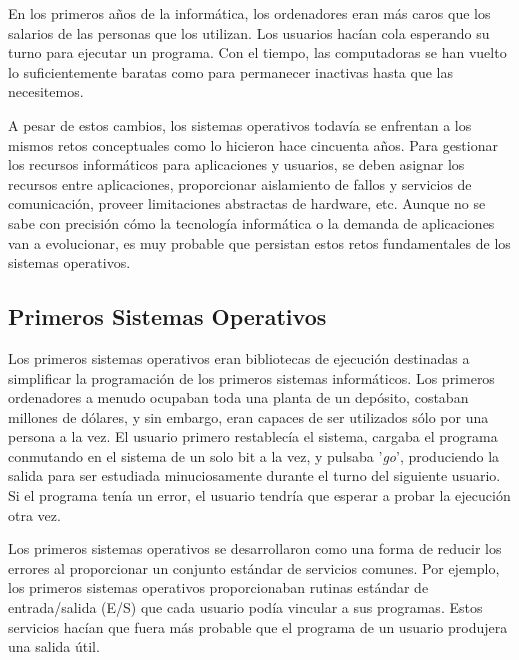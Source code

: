 \documentclass[10pt]{book}
\begin{document}
En los primeros años de la informática, los ordenadores eran más caros que los salarios de las personas que los utilizan. Los usuarios hacían cola esperando su turno para ejecutar un programa. Con el tiempo, las computadoras se han vuelto lo suficientemente baratas como para permanecer inactivas hasta que las necesitemos.

A pesar de estos cambios, los sistemas operativos todavía se enfrentan a los mismos retos conceptuales como lo hicieron hace cincuenta años. Para gestionar los recursos informáticos para aplicaciones y usuarios, se deben asignar los recursos entre aplicaciones, proporcionar aislamiento de fallos y servicios de comunicación, proveer limitaciones abstractas de hardware, etc. Aunque no se sabe con precisión cómo la tecnología informática o la demanda de aplicaciones van a evolucionar, es muy probable que persistan estos retos fundamentales de los sistemas operativos.

\subsection{Primeros Sistemas Operativos}
Los primeros sistemas operativos eran bibliotecas de ejecución destinadas a simplificar la programación de los primeros sistemas informáticos. Los primeros ordenadores a menudo ocupaban toda una planta de un depósito, costaban millones de dólares, y sin embargo, eran capaces de ser utilizados sólo por una persona a la vez. El usuario primero restablecía el sistema, cargaba el programa conmutando en el sistema de un solo bit a la vez, y pulsaba '\textit{go}', produciendo la salida para ser estudiada minuciosamente durante el turno del siguiente usuario. Si el programa tenía un error, el usuario tendría que esperar a probar la ejecución otra vez.

Los primeros sistemas operativos se desarrollaron como una forma de reducir los errores al proporcionar un conjunto estándar de servicios comunes. Por ejemplo, los primeros sistemas operativos proporcionaban rutinas estándar de entrada/salida (E/S) que cada usuario podía vincular a sus programas. Estos servicios hacían que fuera más probable que el programa de un usuario produjera una salida útil.
\end{document}
